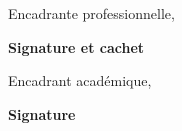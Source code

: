 \thispagestyle{empty}

\begin{center}
    \begin{minipage}[l]{1\columnwidth}
        \begin{tcolorbox}[colback=white,boxrule=5pt,arc=10pt,height=105mm]{
            \vspace{2cm}
            \large \@proSignSentence
            \vspace{1mm}
            \begin{center}
                \Large
                Encadrante professionnelle, \textbf{\@proFramerName}
            \end{center}
            \vspace{5mm}
            \hspace{0.71\columnwidth}\textbf{\large Signature et cachet}
        }
        \end{tcolorbox}
    \end{minipage}
    
    \vspace{2cm}
    
    \begin{minipage}[l]{1\columnwidth}
        \begin{tcolorbox}[colback=white,boxrule=5pt,arc=10pt,height=105mm]{
            \vspace{2cm}
            \large \@academicSignSentence
            \vspace{1mm}
            \begin{center}
                \Large
                Encadrant académique, \textbf{\@academicFramerName}
            \end{center}
            \vspace{5mm}
            \hspace{0.84\columnwidth}\textbf{\large Signature}
        }
        \end{tcolorbox}
    \end{minipage}
\end{center}
